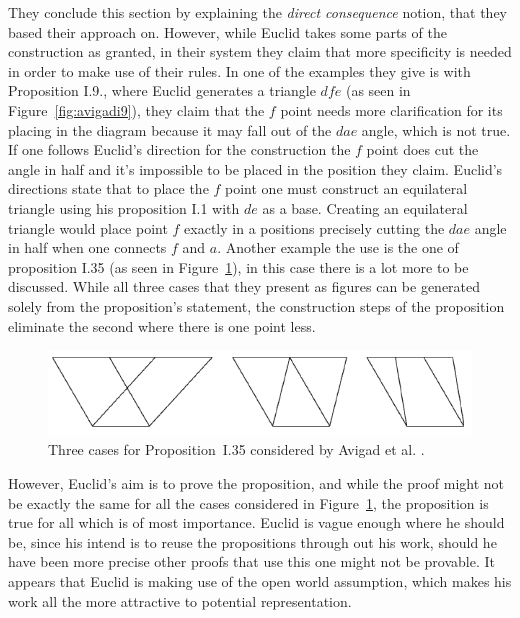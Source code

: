 \documentclass[]{interact}
\theoremstyle{plain}
\theoremstyle{definition}
\theoremstyle{remark}
\newcommand{\term}[1]{\emph{#1\/}}
\begin{document}
They conclude this section by explaining the \term{direct consequence}
notion, that they based their approach on. However, while Euclid takes
some parts of the construction as granted, in their system they claim
that more specificity is needed in order to make use of their rules.
In one of the examples they give is with Proposition I.9., where
Euclid generates a triangle $dfe$ (as seen in
Figure~\ref{fig:avigadi9}), they claim that the $f$ point needs more
clarification for its placing in the diagram because it may fall out
of the $dae$ angle, which is not true. If one follows Euclid's
direction for the construction the $f$ point does cut the angle in
half and it's impossible to be placed in the position they claim.
Euclid's directions state that to place the $f$ point one must
construct an equilateral triangle using his proposition I.1 with $de$
as a base. Creating an equilateral triangle would place point $f$
exactly in a positions precisely cutting the $dae$ angle in half when
one connects $f$ and $a$. Another example the use is the one of
proposition I.35 (as seen in Figure~\ref{fig:avigadi35}), in this case
there is a lot more to be discussed. While all three cases that they
present as figures can be generated solely from the proposition's
statement, the construction steps of the proposition eliminate the
second where there is one point less.


\begin{figure}[h]
  \centering
  \includegraphics[scale=0.7]{avigad-fig9-I35}
  \caption[Avigad et al Approach I.35]{Three cases for
    Proposition~I.35 considered by Avigad et al. \cite{avigad-etal:2009}.}
  \label{fig:avigadi35}
\end{figure}

However, Euclid's aim is to prove the proposition, and while the proof
might not be exactly the same for all the cases considered in
Figure~\ref{fig:avigadi35}, the proposition is true for all which is
of most importance. Euclid is vague enough where he should be, since
his intend is to reuse the propositions through out his work, should
he have been more precise other proofs that use this one might not be
provable. It appears that Euclid is making use of the open world
assumption, which makes his work all the more attractive to potential
representation.
\end{document}
